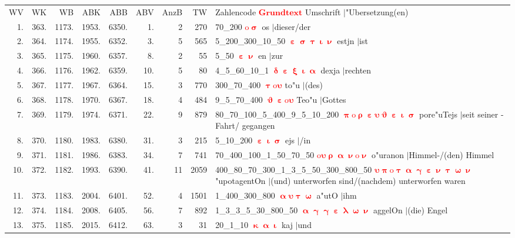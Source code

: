 \documentclass[a4paper,10pt,landscape]{article}
\begin{document}
\begin{tabular}{rrrrrrrrp{120mm}}
WV&WK&WB&ABK&ABB&ABV&AnzB&TW&Zahlencode \textcolor{red}{$\boldsymbol{Grundtext}$} Umschrift $|$"Ubersetzung(en)\\
1.&363.&1173.&1953.&6350.&1.&2&270&70\_200 \textcolor{red}{$\boldsymbol{\mathrm{o}\upsigma}$} os $|$dieser/der\\
2.&364.&1174.&1955.&6352.&3.&5&565&5\_200\_300\_10\_50 \textcolor{red}{$\boldsymbol{\upepsilon\upsigma\uptau\upiota\upnu}$} estjn $|$ist\\
3.&365.&1175.&1960.&6357.&8.&2&55&5\_50 \textcolor{red}{$\boldsymbol{\upepsilon\upnu}$} en $|$zur\\
4.&366.&1176.&1962.&6359.&10.&5&80&4\_5\_60\_10\_1 \textcolor{red}{$\boldsymbol{\updelta\upepsilon\upxi\upiota\upalpha}$} dexja $|$rechten\\
5.&367.&1177.&1967.&6364.&15.&3&770&300\_70\_400 \textcolor{red}{$\boldsymbol{\uptau\mathrm{o}\upsilon}$} to"u $|$(des)\\
6.&368.&1178.&1970.&6367.&18.&4&484&9\_5\_70\_400 \textcolor{red}{$\boldsymbol{\upvartheta\upepsilon\mathrm{o}\upsilon}$} Teo"u $|$Gottes\\
7.&369.&1179.&1974.&6371.&22.&9&879&80\_70\_100\_5\_400\_9\_5\_10\_200 \textcolor{red}{$\boldsymbol{\uppi\mathrm{o}\uprho\upepsilon\upsilon\upvartheta\upepsilon\upiota\upsigma}$} pore"uTejs $|$seit seiner -Fahrt/ gegangen\\
8.&370.&1180.&1983.&6380.&31.&3&215&5\_10\_200 \textcolor{red}{$\boldsymbol{\upepsilon\upiota\upsigma}$} ejs $|$/in\\
9.&371.&1181.&1986.&6383.&34.&7&741&70\_400\_100\_1\_50\_70\_50 \textcolor{red}{$\boldsymbol{\mathrm{o}\upsilon\uprho\upalpha\upnu\mathrm{o}\upnu}$} o"uranon $|$Himmel-/(den) Himmel\\
10.&372.&1182.&1993.&6390.&41.&11&2059&400\_80\_70\_300\_1\_3\_5\_50\_300\_800\_50 \textcolor{red}{$\boldsymbol{\upsilon\uppi\mathrm{o}\uptau\upalpha\upgamma\upepsilon\upnu\uptau\upomega\upnu}$} "upotagentOn $|$(und) unterworfen sind/(nachdem) unterworfen waren\\
11.&373.&1183.&2004.&6401.&52.&4&1501&1\_400\_300\_800 \textcolor{red}{$\boldsymbol{\upalpha\upsilon\uptau\upomega}$} a"utO $|$ihm\\
12.&374.&1184.&2008.&6405.&56.&7&892&1\_3\_3\_5\_30\_800\_50 \textcolor{red}{$\boldsymbol{\upalpha\upgamma\upgamma\upepsilon\uplambda\upomega\upnu}$} aggelOn $|$(die) Engel\\
13.&375.&1185.&2015.&6412.&63.&3&31&20\_1\_10 \textcolor{red}{$\boldsymbol{\upkappa\upalpha\upiota}$} kaj $|$und\\

\end{tabular}
\end{document}
